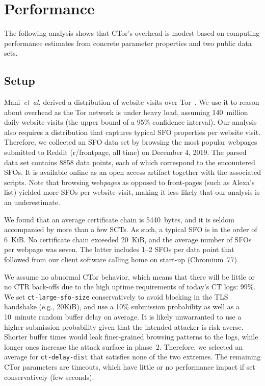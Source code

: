 %
%
\section{Performance} \label{sec:performance}
The following analysis shows that CTor's overhead is modest based on computing
performance estimates from concrete parameter properties and two public data
sets.

\subsection{Setup}
Mani~\emph{et~al.} derived a distribution of website visits over
Tor~\cite{mani}.  We use it to reason about overhead as the Tor network is under
heavy load, assuming 140~million daily website visits (the upper bound of a 95\%
confidence interval).  Our analysis also requires a distribution that captures
typical SFO properties per website visit.  Therefore, we collected an SFO data
set by browsing the most popular webpages submitted to Reddit (r/frontpage, all
time) on December 4, 2019.  The parsed data set contains 8858 data points, each
of which correspond to the encountered SFOs.  It is available online as an open
access artifact together with the associated scripts.  Note that browsing
web\emph{pages} as opposed to front-pages (such as Alexa's list) yielded more
SFOs per website visit, making it less likely that our analysis is an
underestimate.

We found that an average certificate chain is 5440~bytes, and it is seldom
accompanied by more than a few SCTs.  As such, a typical SFO is in the order of
6~KiB.  No certificate chain exceeded 20~KiB, and the average number of SFOs per
webpage was seven.  The latter includes 1--2 SFOs per data point that followed
from our client software calling home on start-up (Chromium~77).

We assume no abnormal CTor behavior, which means that there will be little or
no CTR back-offs due to the high uptime requirements of today's CT logs: 99\%.
We set \texttt{ct-large-sfo-size} conservatively to avoid blocking in the TLS
handshake (e.g., 20KiB), and use a 10\% submission probability as well as a
10~minute random buffer delay on average.  It is likely unwarranted to use a
higher submission probability given that the intended attacker is risk-averse.
Shorter buffer times would leak finer-grained browsing patterns to the logs,
while longer ones increase the attack surface in phase~2.  Therefore, we
selected an average for \texttt{ct-delay-dist} that satisfies none of the two
extremes.  The remaining CTor parameters are timeouts, which have little or no
performance impact if set conservatively (few seconds).

